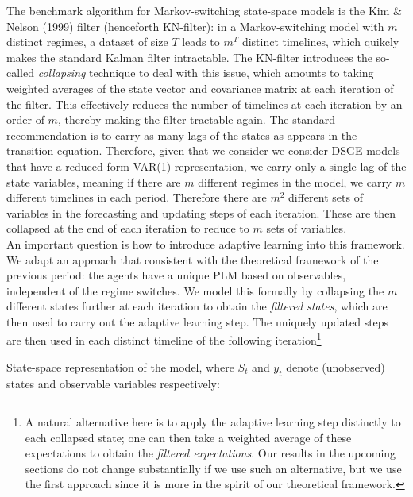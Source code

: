 \documentclass[12pt,reqno]{article}
\numberwithin{equation}{section}
\begin{document}
The benchmark algorithm for Markov-switching state-space models is the Kim \& Nelson (1999) filter (henceforth KN-filter): in a Markov-switching model with $m $ distinct regimes, a dataset of size $T$ leads to $m^T$ distinct timelines, which quikcly makes the standard Kalman filter intractable. The KN-filter introduces the so-called \textit{collapsing} technique to deal with this issue, which amounts to taking weighted averages of the state vector and covariance matrix at each iteration of the filter. This effectively reduces the number of timelines at each iteration by an order of $m$, thereby making the filter tractable again. The standard recommendation is to carry as many lags of the states as appears in the transition equation. Therefore, given that we consider we consider DSGE models that have a reduced-form VAR(1) representation, we carry only a single lag of the state variables, meaning if there are $ m $ different regimes in the model, we carry $m $ different timelines in each period. Therefore there are $m^2$ different sets of variables in the forecasting and updating steps of each iteration. These are then collapsed at the end of each iteration to reduce to $m $ sets of variables. \\
\noindent
An important question is how to introduce adaptive learning into this framework. We adapt an approach that consistent with the theoretical framework of the previous period: the agents have a unique PLM based on observables, independent of the regime switches. We model this formally by collapsing the $m $ different states further at each iteration to obtain the \textit{filtered states}, which are then used to carry out the adaptive learning step. The uniquely updated steps are then used in each distinct timeline of the following iteration\footnote{A natural alternative here is to apply the adaptive learning step distinctly to each collapsed state; one can then take a weighted average of these expectations to obtain the \textit{filtered expectations}. Our results in the upcoming sections do not change substantially if we use such an alternative, but we use the first approach since it is more in the spirit of our theoretical framework.} 




State-space representation of the model, where $S_t $ and $y_t $ denote (unobserved) states and observable variables respectively: \\
\end{document}
